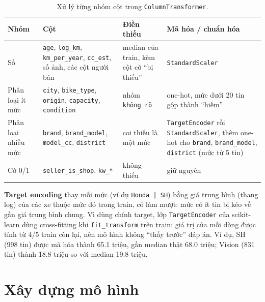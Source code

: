 \begin{table}[H]\centering
\caption{Xử lý từng nhóm cột trong \texttt{ColumnTransformer}.}\label{tab:tab-pipe}
\begin{tabular}{>{\raggedright\arraybackslash}p{2.6cm}>{\raggedright\arraybackslash}p{4.6cm}>{\raggedright\arraybackslash}p{2.9cm}>{\raggedright\arraybackslash}p{4.1cm}}
\toprule
Nhóm & Cột & Điền thiếu & Mã hóa / chuẩn hóa \\
\midrule
Số & \texttt{age}, \texttt{log\_km}, \texttt{km\_per\_year}, \texttt{cc\_est}, số ảnh, các cột người bán & median của train, kèm cột cờ ``bị thiếu'' & \texttt{StandardScaler} \\
Phân loại ít mức & \texttt{city}, \texttt{bike\_type}, \texttt{origin}, \texttt{capacity}, \texttt{condition} & nhóm \texttt{không rõ} & one-hot, mức dưới 20 tin gộp thành ``hiếm'' \\
Phân loại nhiều mức & \texttt{brand}, \texttt{brand\_model}, \texttt{model\_cc}, \texttt{district} & coi thiếu là một mức & \texttt{TargetEncoder} rồi \texttt{StandardScaler}, thêm one-hot cho \texttt{brand}, \texttt{brand\_model}, \texttt{district} (mức từ 5 tin) \\
Cờ 0/1 & \texttt{seller\_is\_shop}, \texttt{kw\_*} & không thiếu & giữ nguyên \\
\bottomrule
\end{tabular}
\end{table}

\textbf{Target encoding} \cite{tab-te} thay mỗi mức (ví dụ \texttt{Honda | SH}) bằng giá trung bình (thang log) của các
xe thuộc mức đó trong train, có làm mượt: mức có ít tin bị kéo về gần giá trung bình chung. Vì dùng chính target, lớp
\texttt{TargetEncoder} của scikit-learn dùng cross-fitting khi \texttt{fit\_transform} trên train: giá trị của mỗi dòng
được tính từ 4/5 train còn lại, nên mô hình không ``thấy trước'' đáp án. Ví dụ, SH (998 tin) được mã hóa thành 65.1 triệu,
gần median thật 68.0 triệu; Vision (831 tin) thành 18.8 triệu so với median 19.8 triệu.


\section{Xây dựng mô hình}

